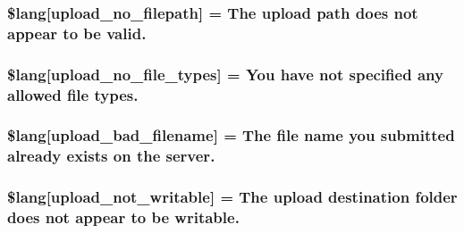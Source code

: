 \subsubsection[{\$lang}]{\setlength{\rightskip}{0pt plus 5cm}\$lang\mbox{[}\textquotesingle{}upload\+\_\+no\+\_\+filepath\textquotesingle{}\mbox{]} = \textquotesingle{}The upload path does not appear to be valid.\textquotesingle{}}\label{upload__lang_8php_a3c17908c53072c6a5ef593760aaaa704}
\hypertarget{upload__lang_8php_ab188c98e583c81905dedaad54ad452bb}{}
\subsubsection[{\$lang}]{\setlength{\rightskip}{0pt plus 5cm}\$lang\mbox{[}\textquotesingle{}upload\+\_\+no\+\_\+file\+\_\+types\textquotesingle{}\mbox{]} = \textquotesingle{}You have not specified any allowed file types.\textquotesingle{}}\label{upload__lang_8php_ab188c98e583c81905dedaad54ad452bb}
\hypertarget{upload__lang_8php_abb379322384f3f35952a539c63e2c8f7}{}
\subsubsection[{\$lang}]{\setlength{\rightskip}{0pt plus 5cm}\$lang\mbox{[}\textquotesingle{}upload\+\_\+bad\+\_\+filename\textquotesingle{}\mbox{]} = \textquotesingle{}The file name you submitted already exists {\bf on} the server.\textquotesingle{}}\label{upload__lang_8php_abb379322384f3f35952a539c63e2c8f7}
\hypertarget{upload__lang_8php_aed6bfb5a9094179427f61fcbb582145b}{}
\subsubsection[{\$lang}]{\setlength{\rightskip}{0pt plus 5cm}\$lang\mbox{[}\textquotesingle{}upload\+\_\+not\+\_\+writable\textquotesingle{}\mbox{]} = \textquotesingle{}The upload destination folder does not appear to be writable.\textquotesingle{}}\label{upload__lang_8php_aed6bfb5a9094179427f61fcbb582145b}
